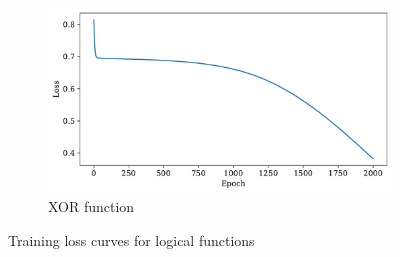 \documentclass[11pt,a4paper]{article}
\begin{document}
\begin{figure}[H]
{\begin{minipage}{0.98\textwidth}
\begin{subfigure}[b]{0.48\textwidth}
        \centering
        \includegraphics[width=\textwidth]{img/xor_loss.pdf}
        \caption{XOR function}
        \label{fig:xor_loss}
    \end{subfigure}
    \caption{Training loss curves for logical functions}
    \label{fig:loss_curves}
    \end{minipage}
    }
\end{figure}
\end{document}
